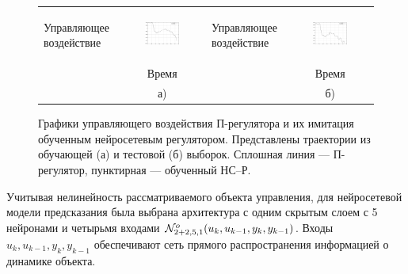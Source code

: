 \begin{figure}
\centering
\begin{tabular}{lclc}
  \begin{sideways}
    {\hspace{1cm}\small Управляющее воздействие}
  \end{sideways}
  &
  \includegraphics[width=0.45\textwidth,%
    totalheight=0.25\textheight]{moby_nnc_pretr_learn}
  &
  \begin{sideways}
    {\hspace{1cm}\small Управляющее воздействие}
  \end{sideways}
  &
  \includegraphics[width=0.45\textwidth,%
    totalheight=0.25\textheight]{moby_nnc_pretr_test}
  \\
  & {\small Время} & & {\small Время}\\
  & а) & & б)\\
\end{tabular}
\caption{Графики управляющего воздействия П-регулятора и их
имитация обученным нейросетевым регулятором.  Представлены траектории
из обучающей (а) и тестовой (б) выборок.  Сплошная линия ---
П-регулятор, пунктирная --- обученный НС--Р.}
\label{fig:moby_nnc_pretr}
\end{figure}


Учитывая нелинейность рассматриваемого объекта управления, для
нейросетевой модели предсказания была выбрана архитектура с одним
скрытым слоем с 5 нейронами и четырьмя входами
$\mathcal{N}^o_{2+2,5,1}(u_k,u_{k-1},y_k,y_{k-1})$.  Входы
$u_k,u_{k-1},y_k,y_{k-1}$ обеспечивают сеть прямого распространения
информацией о динамике объекта.

